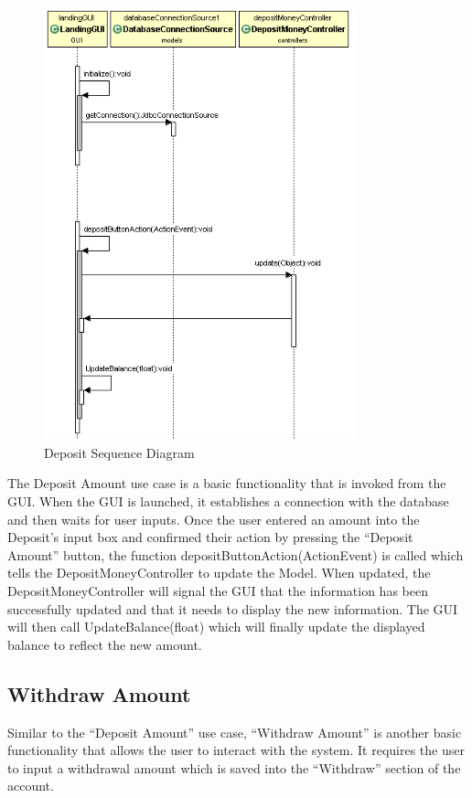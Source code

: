 \documentclass[12pt]{article}
\begin{document}
\begin{figure}[h!]
  \centering
  \includegraphics[width=90mm]{deposit_sequence.png}
  \caption{Deposit Sequence Diagram}
\end{figure}
\clearpage

The Deposit Amount use case is a basic functionality that is invoked from the GUI. When the GUI is launched, it establishes a connection with the database and then waits for user inputs. Once the user entered an amount into the Deposit’s input box and confirmed their action by pressing the “Deposit Amount” button, the function depositButtonAction(ActionEvent) is called which tells the DepositMoneyController to update the Model. When updated, the DepositMoneyController will signal the GUI that the information has been successfully updated and that it needs to display the new information. The GUI will then call UpdateBalance(float) which will finally update the displayed balance to reflect the new amount.



\subsection{Withdraw Amount}
Similar to the “Deposit Amount” use case, “Withdraw Amount” is another basic functionality that allows the user to interact with the system. It requires the user to input a withdrawal amount which is saved into the “Withdraw” section of the account. 
\end{document}
